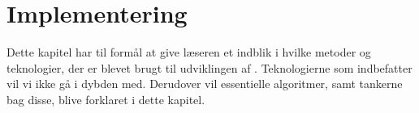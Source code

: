 \chapter{Implementering}
\label{chap:implementering}
Dette kapitel har til formål at give læseren et indblik i hvilke metoder og teknologier, der er blevet brugt til udviklingen af \Foodl. Teknologierne som indbefatter vil vi ikke gå i dybden med. Derudover vil essentielle algoritmer, samt tankerne bag disse, blive forklaret i dette kapitel.


